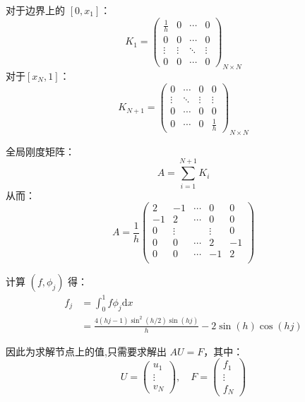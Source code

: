 \documentclass{ctexart}
\begin{document}
对于边界上的 $[0, x_1]$：
\begin{equation}
    K_1 = \begin{pmatrix}
        \frac{1}{h} & 0 & \cdots & 0\\
        0 & 0 & \cdots & 0 \\
        \vdots & \vdots & \ddots & \vdots \\
        0 & 0 & \cdots & 0
    \end{pmatrix}_{N \times N}
\end{equation}
对于$[x_N, 1]$：
\begin{equation}
    K_{N+1} = \begin{pmatrix}
        0 & \cdots & 0& 0\\
        \vdots & \ddots & \vdots & \vdots \\
        0 & \cdots & 0& 0 \\
        0 & \cdots & 0 & \frac{1}{h}
    \end{pmatrix}_{N \times N}
\end{equation}

全局刚度矩阵：
\begin{equation}
    A = \sum_{i = 1} ^ {N+1} K_i 
\end{equation}
从而：
\begin{equation}
    A = \frac{1}{h}\begin{pmatrix}
          2 & -1 &  \cdots &0 & 0 \\
         -1 & 2  &  \cdots &0 & 0\\
          0 & \vdots &  & \vdots &0 \\
          0 & 0 & \cdots& 2 & -1\\
          0 & 0 & \cdots& -1 & 2\\
    \end{pmatrix}
\end{equation}

计算 $(f, \phi_j)$ 得：
\begin{equation}
\begin{aligned}
    f_j &= \int_0 ^ 1 f \phi_j \mathrm dx\\
    &= \frac{4 (h j-1) \sin ^2\left(h/2\right) \sin (h j)}{h}-2 \sin (h) \cos (h j)
\end{aligned}
\end{equation}

因此为求解节点上的值,只需要求解出 $A U = F$，其中：
\begin{equation}
    U  = \begin{pmatrix}
        u_1\\
        \vdots\\
        v_N
    \end{pmatrix},
    \quad
    F = \begin{pmatrix}
        f_1\\
        \vdots\\
        f_N
    \end{pmatrix}
\end{equation}
\end{document}

